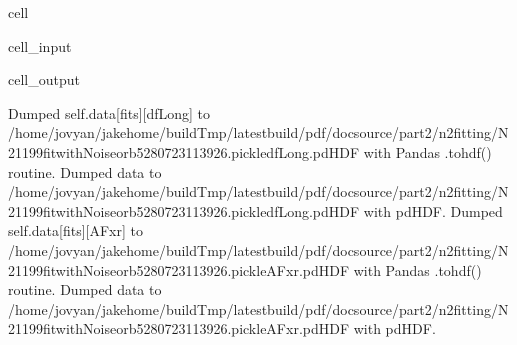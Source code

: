 \documentclass[letterpaper,table,10pt,english]{jupyterBook}
\begin{document}
\begin{sphinxuseclass}{cell}\begin{sphinxVerbatimInput}

\begin{sphinxuseclass}{cell_input}
\begin{sphinxVerbatim}[commandchars=\\\{\}]

      
\end{sphinxVerbatim}

\end{sphinxuseclass}\end{sphinxVerbatimInput}
\begin{sphinxVerbatimOutput}

\begin{sphinxuseclass}{cell_output}
\begin{sphinxVerbatim}[commandchars=\\\{\}]
Dumped self.data[fits][dfLong] to /home/jovyan/jake\PYGZhy{}home/buildTmp/\PYGZus{}latest\PYGZus{}build/pdf/doc\PYGZhy{}source/part2/n2fitting/N2\PYGZus{}1199\PYGZus{}fit\PYGZus{}withNoise\PYGZus{}orb5\PYGZus{}280723\PYGZus{}11\PYGZhy{}39\PYGZhy{}26.pickle\PYGZus{}dfLong.pdHDF with Pandas .to\PYGZus{}hdf() routine.
Dumped data to /home/jovyan/jake\PYGZhy{}home/buildTmp/\PYGZus{}latest\PYGZus{}build/pdf/doc\PYGZhy{}source/part2/n2fitting/N2\PYGZus{}1199\PYGZus{}fit\PYGZus{}withNoise\PYGZus{}orb5\PYGZus{}280723\PYGZus{}11\PYGZhy{}39\PYGZhy{}26.pickle\PYGZus{}dfLong.pdHDF with pdHDF.
Dumped self.data[fits][AFxr] to /home/jovyan/jake\PYGZhy{}home/buildTmp/\PYGZus{}latest\PYGZus{}build/pdf/doc\PYGZhy{}source/part2/n2fitting/N2\PYGZus{}1199\PYGZus{}fit\PYGZus{}withNoise\PYGZus{}orb5\PYGZus{}280723\PYGZus{}11\PYGZhy{}39\PYGZhy{}26.pickle\PYGZus{}AFxr.pdHDF with Pandas .to\PYGZus{}hdf() routine.
Dumped data to /home/jovyan/jake\PYGZhy{}home/buildTmp/\PYGZus{}latest\PYGZus{}build/pdf/doc\PYGZhy{}source/part2/n2fitting/N2\PYGZus{}1199\PYGZus{}fit\PYGZus{}withNoise\PYGZus{}orb5\PYGZus{}280723\PYGZus{}11\PYGZhy{}39\PYGZhy{}26.pickle\PYGZus{}AFxr.pdHDF with pdHDF.
\end{sphinxVerbatim}

\end{sphinxuseclass}\end{sphinxVerbatimOutput}

\end{sphinxuseclass}
\end{document}
